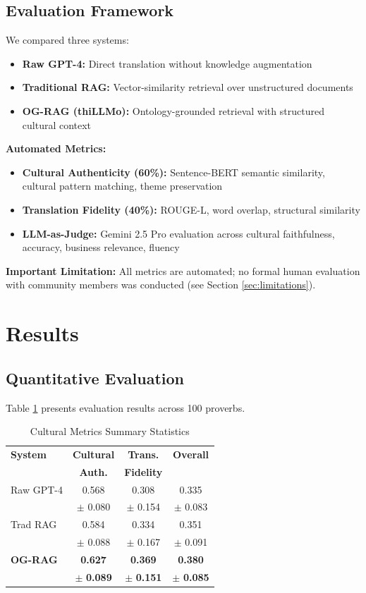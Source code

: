 \documentclass[11pt,twocolumn]{article}
\begin{document}
\subsection{Evaluation Framework}

We compared three systems:
\begin{itemize}
    \item \textbf{Raw GPT-4:} Direct translation without knowledge augmentation
    \item \textbf{Traditional RAG:} Vector-similarity retrieval over unstructured documents
    \item \textbf{OG-RAG (thiLLMo):} Ontology-grounded retrieval with structured cultural context
\end{itemize}

\textbf{Automated Metrics:}
\begin{itemize}
    \item \textbf{Cultural Authenticity (60\%):} Sentence-BERT semantic similarity, cultural pattern matching, theme preservation
    \item \textbf{Translation Fidelity (40\%):} ROUGE-L, word overlap, structural similarity
    \item \textbf{LLM-as-Judge:} Gemini 2.5 Pro evaluation across cultural faithfulness, accuracy, business relevance, fluency
\end{itemize}

\textbf{Important Limitation:} All metrics are automated; no formal human evaluation with community members was conducted (see Section \ref{sec:limitations}).

\section{Results}

\subsection{Quantitative Evaluation}

Table \ref{tab:results} presents evaluation results across 100 proverbs.

\begin{table}[h]
\centering
\caption{Cultural Metrics Summary Statistics}
\label{tab:results}
\begin{tabular}{lccc}
\toprule
\textbf{System} & \textbf{Cultural} & \textbf{Trans.} & \textbf{Overall} \\
 & \textbf{Auth.} & \textbf{Fidelity} &  \\
\midrule
Raw GPT-4 & 0.568 & 0.308 & 0.335 \\
 & $\pm$ 0.080 & $\pm$ 0.154 & $\pm$ 0.083 \\
Trad RAG & 0.584 & 0.334 & 0.351 \\
 & $\pm$ 0.088 & $\pm$ 0.167 & $\pm$ 0.091 \\
\textbf{OG-RAG} & \textbf{0.627} & \textbf{0.369} & \textbf{0.380} \\
 & $\pm$ \textbf{0.089} & $\pm$ \textbf{0.151} & $\pm$ \textbf{0.085} \\
\bottomrule
\end{tabular}
\end{table}
\end{document}
